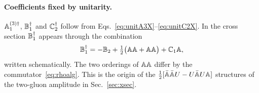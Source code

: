 \paragraph*{Coefficients fixed by unitarity.} $\mathbb{A}^{(3)\dagger}_1$, $\mathbb{B}_1^\dagger$ and $\mathbb{C}_2^\dagger$ follow from Eqs.~\eqref{eq:unitA3X}--\eqref{eq:unitC2X}. In the cross section $\mathbb{B}_1^\dagger$ appears through the combination
\begin{equation}
\mathbb{B}^\dagger_1=-\mathbb{B}_2+\tfrac12\big(\mathbb{A}\mathbb{A}+\mathbb{A}\mathbb{A}\big)+\mathbb{C}_1\mathbb{A},
\end{equation}
written schematically. The two orderings of $\mathbb{A}\mathbb{A}$ differ by the commutator~\eqref{eq:rhoalg}. This is the origin of the $\frac12[\bar{\mathbb{A}}\bar{\mathbb{A}}U-U\bar{\mathbb{A}}U\mathbb{A}]$ structures of the two-gluon amplitude in Sec.~\ref{sec:xsec}.
